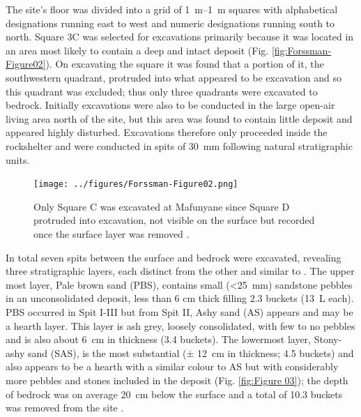 The site’s floor was divided into a grid of \SIrange{1}{1}{\meter} squares with alphabetical designations running east to west and numeric designations running south to north. 
Square 3C was selected for excavations primarily because it was located in an area most likely to contain a deep and intact deposit (Fig. \ref{fig:Forssman-Figure02}). 
On excavating the square it was found that a portion of it, the southwestern quadrant, protruded into what appeared to be \textcite['s]{Walker_1994} excavation and so this quadrant was excluded; thus only three quadrants were excavated to bedrock. Initially excavations were also to be conducted in the large open-air living area north of the site, but this area was found to contain little deposit and appeared highly disturbed. 
Excavations therefore only proceeded inside the rockshelter and were conducted in spits of \SI{30}{\milli\meter} following natural stratigraphic units.

	\begin{figure}
		\texttt{[image: ../figures/Forssman-Figure02.png]}
		\caption{Only Square C was excavated at Mafunyane since Square D protruded into \textcite['s]{Walker_1994} excavation, not visible on the surface but recorded once the surface layer was removed \parencite[from][96]{Forssman_2014a}.}
		\label{fig:Forssmann-Figure02}
	\end{figure}

In total seven spits between the surface and bedrock were excavated, revealing three stratigraphic layers, each distinct from the other and similar to \textcite['s]{Walker_1994}. 
The upper most layer, Pale brown sand (PBS), contains small (<\SI{25}{\milli\meter}) sandstone pebbles in an unconsolidated deposit, less than 6 cm thick filling 2.3 buckets (\SI{13}{\liter} each). 
PBS occurred in Spit I-III but from Spit II, Ashy sand (AS) appears and may be a hearth layer. This layer is ash grey, loosely consolidated, with few to no pebbles and is also about \SI{6}{\centi\meter} in thickness (3.4 buckets). 
The lowermost layer, Stony-ashy sand (SAS), is the most substantial (± \SI{12}{\centi\meter} in thickness; 4.5 buckets) and also appears to be a hearth with a similar colour to AS but with considerably more pebbles and stones included in the deposit (Fig. \ref{fig:Figure 03}); the depth of bedrock was on average \SI{20}{\centi\meter} below the surface and a total of 10.3 buckets was removed from the site \parencite[for more details see][95]{Forssman 2014a}. 

